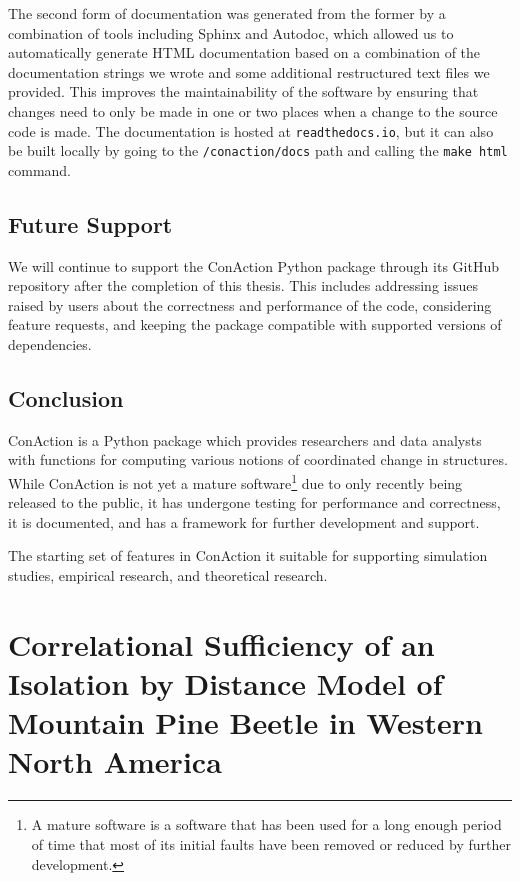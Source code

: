 \documentclass[
  letterpaper,
  DIV=11,
  numbers=noendperiod]{scrreprt}
\begin{document}
The second form of documentation was generated from the former by a
combination of tools including Sphinx and Autodoc, which allowed us to
automatically generate HTML documentation based on a combination of the
documentation strings we wrote and some additional restructured text
files we provided. This improves the maintainability of the software by
ensuring that changes need to only be made in one or two places when a
change to the source code is made. The documentation is hosted at
\texttt{readthedocs.io}, but it can also be built locally by going to
the \texttt{/conaction/docs} path and calling the \texttt{make html}
command.

\section{Future Support}\label{future-support}

We will continue to support the ConAction Python package through its
GitHub repository after the completion of this thesis. This includes
addressing issues raised by users about the correctness and performance
of the code, considering feature requests, and keeping the package
compatible with supported versions of dependencies.

\section{Conclusion}\label{conclusion-1}

ConAction is a Python package which provides researchers and data
analysts with functions for computing various notions of coordinated
change in structures. While ConAction is not yet a mature
software\footnote{A mature software is a software that has been used for a long enough period of time that most of its initial faults have been removed or reduced by further development.}
due to only recently being released to the public, it has undergone
testing for performance and correctness, it is documented, and has a
framework for further development and support.

The starting set of features in ConAction it suitable for supporting
simulation studies, empirical research, and theoretical research.


\chapter{Correlational Sufficiency of an Isolation by Distance Model of
Mountain Pine Beetle in Western North
America}\label{correlational-sufficiency-of-an-isolation-by-distance-model-of-mountain-pine-beetle-in-western-north-america}
\end{document}
